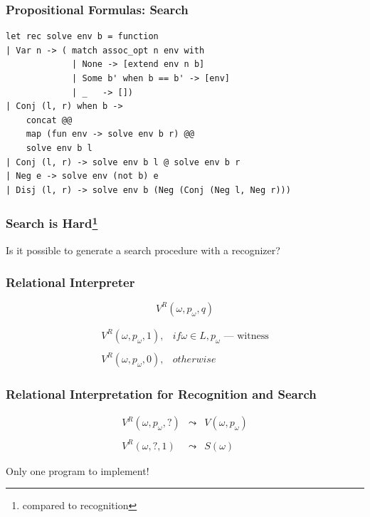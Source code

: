 \documentclass[xcolor=table]{beamer}
\begin{document}
\begin{frame}[fragile]
  \transwipe[direction=90]
  \frametitle{Propositional Formulas: Search}

\begin{lstlisting}
let rec solve env b = function
| Var n -> ( match assoc_opt n env with 
             | None -> [extend env n b]
             | Some b' when b == b' -> [env] 
             | _   -> [])
| Conj (l, r) when b ->
    concat @@ 
    map (fun env -> solve env b r) @@ 
    solve env b l
| Conj (l, r) -> solve env b l @ solve env b r
| Neg e -> solve env (not b) e
| Disj (l, r) -> solve env b (Neg (Conj (Neg l, Neg r))) 
\end{lstlisting}
\end{frame}

\begin{frame}[fragile]
  \transwipe[direction=90]
  \frametitle{Search is Hard\footnote{compared to recognition}}
\begin{center}
Is it possible to generate a search procedure with a recognizer? 
\end{center}
\end{frame}


\begin{frame}[fragile]
  \transwipe[direction=90]
  \frametitle{Relational Interpreter}
\[ V^R(\omega, p_{\omega}, q) \]

\[
\begin{array}{ll}
  V^R(\omega, p_{\omega}, 1), & if \omega \in L, p_{\omega} \text{ --- witness} \\
  & \\
  V^R(\omega, p_{\omega}, 0), & otherwise
\end{array}  
\] 
\end{frame}


\begin{frame}[fragile]
  \transwipe[direction=90]
  \frametitle{Relational Interpretation for Recognition and Search}

\[
\begin{array}{rcl}
 V^R(\omega, p_{\omega}, ?) & \leadsto & V(\omega, p_{\omega}) \\
 & \\ 
 V^R(\omega, ?, 1) & \leadsto & S(\omega) 
\end{array} 
\]

\vspace*{\fill}

\begin{center} Only one program to implement! \end{center}
\end{frame}
\end{document}
